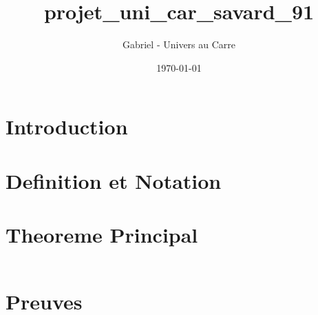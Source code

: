 \documentclass[12pt]{article}
\title{projet_uni_car_savard_91}
\author{Gabriel - Univers au Carre}
\date{\today}
\begin{document}
\maketitle


\section{Introduction}



\section{Definition et Notation}



\section{Theoreme Principal}


\begin{equation}
\end{equation}


\section{Preuves}


\end{document}
